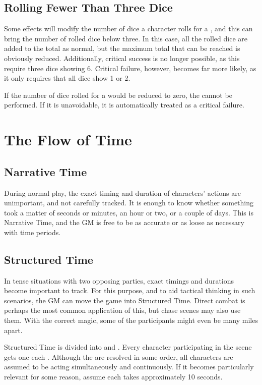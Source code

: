\subsection{Rolling Fewer Than Three Dice}

Some effects will modify the number of dice a character rolls for a {\test}, and this can bring the number of rolled dice below three.
In this case, all the rolled dice are added to the total as normal, but the maximum total that can be reached is obviously reduced.
Additionally, critical success is no longer possible, as this require three dice showing 6.
Critical failure, however, becomes far more likely, as it only requires that all dice show 1 or 2.

If the number of dice rolled for a {\test} would be reduced to zero, the {\test} cannot be performed.
If it is unavoidable, it is automatically treated as a critical failure.

\section{The Flow of Time}

\subsection{Narrative Time}

During normal play, the exact timing and duration of characters' actions are unimportant, and not carefully tracked.
It is enough to know whether something took a matter of seconds or minutes, an hour or two, or a couple of days.
This is Narrative Time, and the GM is free to be as accurate or as loose as necessary with time periods.

\subsection{Structured Time}

In tense situations with two opposing parties, exact timings and durations become important to track.
For this purpose, and to aid tactical thinking in such scenarios, the GM can move the game into Structured Time.
Direct combat is perhaps the most common application of this, but chase scenes may also use them.
With the correct magic, some of the participants might even be many miles apart.

Structured Time is divided into {\rounds} and {\turns}.
Every character participating in the scene gets one {\turn} each {\round}.
Although the {\turns} are resolved in some order, all characters are assumed to be acting simultaneously and continuously.
If it becomes particularly relevant for some reason, assume each {\round} takes approximately 10 seconds.

